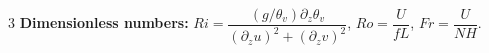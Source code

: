 \documentclass[9pt,letterpaper]{extarticle}
\newcommand{\T}[1]{\textbf{#1}}
\begin{document}
\begin{multicols}{3}
\vspace{2pt}
\T{Dimensionless numbers:}
$Ri=\dfrac{(g/\theta_v)\partial_z\theta_v}{(\partial_z u)^2+(\partial_z v)^2}$, $Ro=\dfrac{U}{fL}$, $Fr=\dfrac{U}{NH}$.

\end{multicols}
\end{document}
